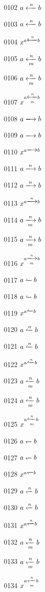\documentclass{article}
\begin{document}
0102 $a\xlongleftarrow{n}b$\par
0103 $\displaystyle a\xlongleftarrow{n}b$\par
0104 $x^{a\xlongleftarrow{n}b}$\par
0105 $a\xlongleftarrow[m]{n}b$\par
0106 $\displaystyle a\xlongleftarrow[m]{n}b$\par
0107 $x^{a\xlongleftarrow[m]{n}b}$\par
0108 $a\xlongrightarrow{}b$\par
0109 $\displaystyle a\xlongrightarrow{}b$\par
0110 $x^{a\xlongrightarrow{}b}$\par
0111 $a\xlongrightarrow{n}b$\par
0112 $\displaystyle a\xlongrightarrow{n}b$\par
0113 $x^{a\xlongrightarrow{n}b}$\par
0114 $a\xlongrightarrow[m]{n}b$\par
0115 $\displaystyle a\xlongrightarrow[m]{n}b$\par
0116 $x^{a\xlongrightarrow[m]{n}b}$\par
0117 $a\xleftharpoonup{}b$\par
0118 $\displaystyle a\xleftharpoonup{}b$\par
0119 $x^{a\xleftharpoonup{}b}$\par
0120 $a\xleftharpoonup{n}b$\par
0121 $\displaystyle a\xleftharpoonup{n}b$\par
0122 $x^{a\xleftharpoonup{n}b}$\par
0123 $a\xleftharpoonup[m]{n}b$\par
0124 $\displaystyle a\xleftharpoonup[m]{n}b$\par
0125 $x^{a\xleftharpoonup[m]{n}b}$\par
0126 $a\xleftharpoondown{}b$\par
0127 $\displaystyle a\xleftharpoondown{}b$\par
0128 $x^{a\xleftharpoondown{}b}$\par
0129 $a\xleftharpoondown{n}b$\par
0130 $\displaystyle a\xleftharpoondown{n}b$\par
0131 $x^{a\xleftharpoondown{n}b}$\par
0132 $a\xleftharpoondown[m]{n}b$\par
0133 $\displaystyle a\xleftharpoondown[m]{n}b$\par
0134 $x^{a\xleftharpoondown[m]{n}b}$\par
\end{document}
